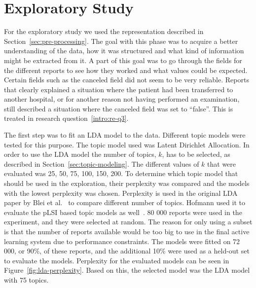 \section{Exploratory Study}\label{sec:exploratory-study}

For the exploratory study we used the representation described in Section~\ref{sec:pre-processing}.
The goal with this phase was to acquire a better understanding of the data, how it was structured and what kind of information might be extracted from it.
A part of this goal was to go through the fields for the different reports to see how they worked and what values could be expected.
Certain fields such as the canceled field did not seem to be very reliable. 
Reports that clearly explained a situation where the patient had been transferred to another hospital, or for another reason not having performed an examination, still described a situation where the canceled field was set to ``false''.
This is treated in research question~\ref{intro:re-q3}.

The first step was to fit an LDA model to the data.
Different topic models were tested for this purpose.
The topic model used was Latent Dirichlet Allocation.
In order to use the LDA model the number of topics, $k$, has to be selected, as described in Section~\ref{sec:topic-modeling}.
The different values of $k$ that were evaluated was 25, 50, 75, 100, 150, 200.
To determine which topic model that should be used in the exploration, their perplexity was compared and the models with the lowest perplexity was chosen.
Perplexity is used in the original LDA paper by Blei et al\@.~\cite{blei2003latent} to compare different number of topics.
Hofmann used it to evaluate the pLSI based topic models as well~\cite{hofmann1999probabilistic}.
80 000 reports were used in the experiment, and they were selected at random.
The reason for only using a subset is that the number of reports available would be too big to use in the final active learning system due to performance constraints.
The models were fitted on 72 000, or 90\%, of these reports, and the additional 10\% were used as a held-out set to evaluate the models.
Perplexity for the evaluated models can be seen in Figure~\ref{fig:lda-perplexity}.
Based on this, the selected model was the LDA model with 75 topics.


